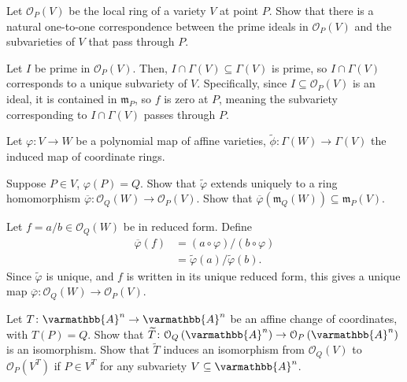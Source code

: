 \documentclass[10pt]{mypackage}
\renewcommand*{\mathbb}[1]{\varmathbb{#1}}
\newcommand{\A}{\mathbb{A}}
\begin{document}
\begin{exercise}[Exercise 2.18]
  Let $\mathcal{O}_P(V)$ be the local ring of a variety $V$ at point $P$. Show that there is a natural one-to-one correspondence between the prime ideals in $\mathcal{O}_P(V)$ and the subvarieties of $V$ that pass through $P$. 
\end{exercise}
\begin{solution}
  Let $I$ be prime in $\mathcal{O}_P(V)$. Then, $I\cap \Gamma(V)\subseteq \Gamma(V)$  is prime, so $I\cap \Gamma(V)$ corresponds to a unique subvariety of $V$. Specifically, since $I\subseteq \mathcal{O}_P(V)$ is an ideal, it is contained in $\mathfrak{m}_P$, so $f$ is zero at $P$, meaning the subvariety corresponding to $I\cap \Gamma(V)$ passes through $P$.
\end{solution}
\begin{exercise}[Exercise 2.21]
Let $\varphi\colon V\rightarrow W$ be a polynomial map of affine varieties, $\widetilde{\phi}\colon \Gamma(W)\rightarrow \Gamma(V)$ the induced map of coordinate rings.\newline

Suppose $P\in V$, $\varphi\left( P \right) = Q$. Show that $\widetilde{\varphi}$ extends uniquely to a ring homomorphism $ \overline{\varphi}\colon\mathcal{O}_Q(W)\to \mathcal{O}_P(V)$. Show that $ \overline{\varphi}\left( \mathfrak{m}_Q(W) \right) \subseteq \mathfrak{m}_P(V) $.
\end{exercise}
\begin{solution}
  Let $f = a/b\in \mathcal{O}_Q(W)$ be in reduced form. Define
  \begin{align*}
    \overline{\varphi}\left( f \right) &= (a\circ\varphi)/(b\circ\varphi)\\
                                       &= \widetilde{\varphi}(a)/\widetilde{\varphi}(b).
  \end{align*}
  Since $\widetilde{\varphi}$ is unique, and $f$ is written in its unique reduced form, this gives a unique map $ \overline{\varphi}\colon \mathcal{O}_Q(W)\rightarrow \mathcal{O}_P(V) $. 
\end{solution}
\begin{exercise}[Exercise 2.22]
Let $T\colon \A^n\rightarrow \A^n$ be an affine change of coordinates, with $T(P) = Q$. Show that $\widetilde{T}\colon \mathcal{O}_Q\left( \A^n \right)\rightarrow \mathcal{O}_P\left( \A^n \right)$ is an isomorphism. Show that $\widetilde{T}$ induces an isomorphism from $\mathcal{O}_Q\left( V \right)$ to $\mathcal{O}_P\left( V^T \right)$ if $P\in V^T$ for any subvariety $V\subseteq \A^n$.
\end{exercise}
\end{document}
